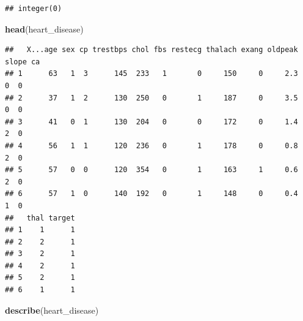 \documentclass[]{article}
\newenvironment{Shaded}{\begin{snugshade}}{\end{snugshade}}
\newcommand{\KeywordTok}[1]{\textcolor[rgb]{0.13,0.29,0.53}{\textbf{#1}}}
\newcommand{\NormalTok}[1]{#1}
\begin{document}
\begin{verbatim}
## integer(0)
\end{verbatim}

\begin{Shaded}
\begin{Highlighting}[]
\KeywordTok{head}\NormalTok{(heart_disease)}
\end{Highlighting}
\end{Shaded}

\begin{verbatim}
##   X...age sex cp trestbps chol fbs restecg thalach exang oldpeak slope ca
## 1      63   1  3      145  233   1       0     150     0     2.3     0  0
## 2      37   1  2      130  250   0       1     187     0     3.5     0  0
## 3      41   0  1      130  204   0       0     172     0     1.4     2  0
## 4      56   1  1      120  236   0       1     178     0     0.8     2  0
## 5      57   0  0      120  354   0       1     163     1     0.6     2  0
## 6      57   1  0      140  192   0       1     148     0     0.4     1  0
##   thal target
## 1    1      1
## 2    2      1
## 3    2      1
## 4    2      1
## 5    2      1
## 6    1      1
\end{verbatim}

\begin{Shaded}
\begin{Highlighting}[]
\KeywordTok{describe}\NormalTok{(heart_disease)}
\end{Highlighting}
\end{Shaded}
\end{document}

